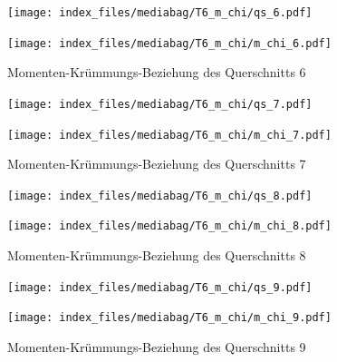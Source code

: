 \documentclass[
  11pt,
  letterpaper,
]{scrreprt}
\begin{document}
\begin{figure}[H]

\begin{minipage}{0.50\linewidth}
\texttt{[image: index\_files/mediabag/T6\_m\_chi/qs\_6.pdf]}\end{minipage}%
%
\begin{minipage}{0.50\linewidth}
\texttt{[image: index\_files/mediabag/T6\_m\_chi/m\_chi\_6.pdf]}\end{minipage}%

\caption{\label{fig-mchi_anhang}Momenten-Krümmungs-Beziehung des
Querschnitts 6}

\end{figure}%

\begin{figure}[H]

\begin{minipage}{0.50\linewidth}
\texttt{[image: index\_files/mediabag/T6\_m\_chi/qs\_7.pdf]}\end{minipage}%
%
\begin{minipage}{0.50\linewidth}
\texttt{[image: index\_files/mediabag/T6\_m\_chi/m\_chi\_7.pdf]}\end{minipage}%

\caption{\label{fig-mchi_anhang}Momenten-Krümmungs-Beziehung des
Querschnitts 7}

\end{figure}%

\begin{figure}[H]

\begin{minipage}{0.50\linewidth}
\texttt{[image: index\_files/mediabag/T6\_m\_chi/qs\_8.pdf]}\end{minipage}%
%
\begin{minipage}{0.50\linewidth}
\texttt{[image: index\_files/mediabag/T6\_m\_chi/m\_chi\_8.pdf]}\end{minipage}%

\caption{\label{fig-mchi_anhang}Momenten-Krümmungs-Beziehung des
Querschnitts 8}

\end{figure}%

\begin{figure}[H]

\begin{minipage}{0.50\linewidth}
\texttt{[image: index\_files/mediabag/T6\_m\_chi/qs\_9.pdf]}\end{minipage}%
%
\begin{minipage}{0.50\linewidth}
\texttt{[image: index\_files/mediabag/T6\_m\_chi/m\_chi\_9.pdf]}\end{minipage}%

\caption{\label{fig-mchi_anhang}Momenten-Krümmungs-Beziehung des
Querschnitts 9}

\end{figure}%
\end{document}
